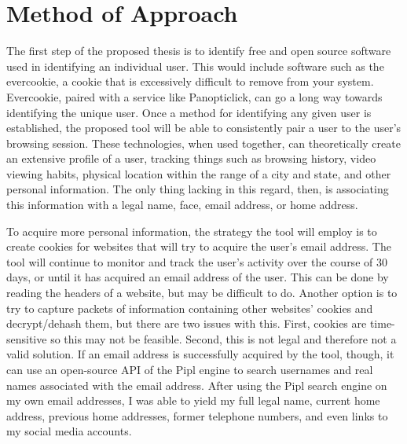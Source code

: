 \documentclass[11pt]{article}
\begin{document}
\vspace*{-.2in}
\section{Method of Approach}
\label{sec:method}
\vspace*{-.1in}


The first step of the proposed thesis is to identify free and open source software used in identifying an individual user. This would include software such as the evercookie, a cookie that is excessively difficult to remove from your system\cite{evercookie}. Evercookie, paired with a service like Panopticlick\cite{panopticlick}, can go a long way towards identifying the unique user. Once a method for identifying any given user is established, the proposed tool will be able to consistently pair a user to the user's browsing session. These technologies, when used together, can theoretically create an extensive profile of a user, tracking things such as browsing history, video viewing habits, physical location within the range of a city and state, and other personal information. The only thing lacking in this regard, then, is associating this information with a legal name, face, email address, or home address. 

To acquire more personal information, the strategy the tool will employ is to create cookies for websites that will try to acquire the user's email address. The tool will continue to monitor and track the user's activity over the course of 30 days, or until it has acquired an email address of the user. This can be done by reading the headers of a website, but may be difficult to do. Another option is to try to capture packets of information containing other websites' cookies and decrypt/dehash them, but there are two issues with this. First, cookies are time-sensitive so this may not be feasible. Second, this is not legal and therefore not a valid solution. If an email address is successfully acquired by the tool, though, it can use an open-source API of the Pipl engine to search usernames and real names associated with the email address\cite{pipl-api}. After using the Pipl search engine on my own email addresses, I was able to yield my full legal name, current home address, previous home addresses, former telephone numbers, and even links to my social media accounts. 
\end{document}

